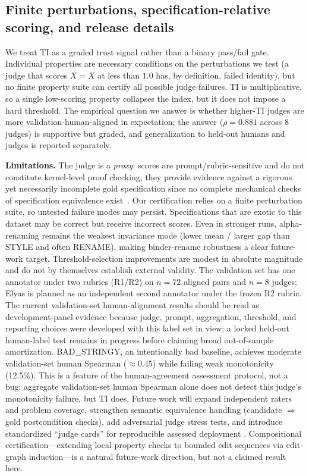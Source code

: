 \documentclass{article}
\begin{document}
\subsection{Finite perturbations, specification-relative scoring, and release details}
We treat TI as a graded trust signal rather than a binary pass/fail gate.
Individual properties are necessary conditions on the perturbations we test (a judge that scores \(X=X\) at less than \(1.0\) has, by definition, failed identity), but no finite property suite can certify all possible judge failures.
TI is multiplicative, so a single low-scoring property collapses the index, but it does not impose a hard threshold.
The empirical question we answer is whether higher-TI judges are more validation-human-aligned in expectation; the answer (\(\rho=0.881\) across \(8\) judges) is supportive but graded, and generalization to held-out humans and judges is reported separately.

\textbf{Limitations.} The judge is a \emph{proxy}: scores are prompt/rubric-sensitive and do not constitute kernel-level proof checking; they provide evidence against a rigorous yet necessarily incomplete gold specification since no complete mechanical checks of specification equivalence exist~\citep{rice1953}.
Our certification relies on a finite perturbation suite, so untested failure modes may persist. Specifications that are exotic to this dataset may be correct but receive incorrect scores.
Even in stronger runs, alpha-renaming remains the weakest invariance mode (lower mean / larger gap than STYLE and often RENAME), making binder-rename robustness a clear future-work target.
Threshold-selection improvements are modest in absolute magnitude and do not by themselves establish external validity.
The validation set has one annotator under two rubrics (R1/R2) on \(n=72\) aligned pairs and \(n=8\) judges; Elyas is planned as an independent second annotator under the frozen R2 rubric.
The current validation-set human-alignment results should be read as development-panel evidence because judge, prompt, aggregation, threshold, and reporting choices were developed with this label set in view; a locked held-out human-label test remains in progress before claiming broad out-of-sample amortization.
BAD\_STRINGY, an intentionally bad baseline, achieves moderate validation-set human Spearman (\(\approx0.45\)) while failing weak monotonicity (12.5\%).
This is a feature of the human-agreement assessment protocol, not a bug: aggregate validation-set human Spearman alone does not detect this judge's monotonicity failure, but TI does.
Future work will expand independent raters and problem coverage, strengthen semantic equivalence handling (candidate $\Rightarrow$ gold postcondition checks), add adversarial judge stress tests, and introduce standardized ``judge cards'' for reproducible assessed deployment \citep{zhou2025graders}.
Compositional certification---extending local property checks to bounded edit sequences via edit-graph induction---is a natural future-work direction, but not a claimed result here.
\end{document}
